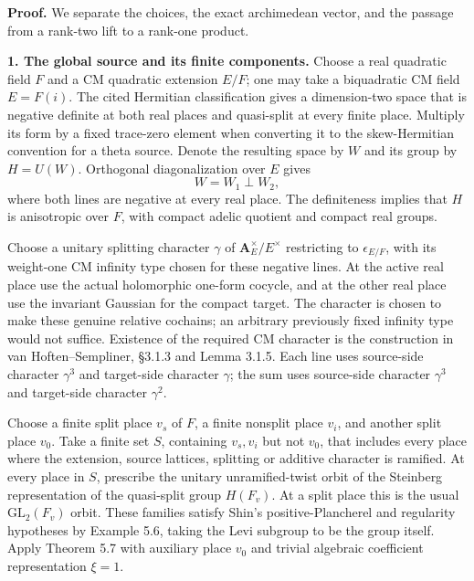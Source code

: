 \documentclass[11pt,a4paper]{article}
\theoremstyle{definition}
\begin{document}
\textbf{Proof.} We separate the choices, the exact archimedean vector, and the passage from a rank-two lift to a rank-one product.

\textbf{1. The global source and its finite components.} Choose a real quadratic field \(F\) and a CM quadratic extension \(E/F\); one may take a biquadratic CM field \(E=F(i)\). The cited Hermitian classification gives a dimension-two space that is negative definite at both real places and quasi-split at every finite place. Multiply its form by a fixed trace-zero element when converting it to the skew-Hermitian convention for a theta source. Denote the resulting space by \(W\) and its group by \(H=U(W)\). Orthogonal diagonalization over \(E\) gives \[
W=W_1\perp W_2,
\] where both lines are negative at every real place. The definiteness implies that \(H\) is anisotropic over \(F\), with compact adelic quotient and compact real groups.

Choose a unitary splitting character \(\gamma\) of \(\mathbf A_E^\times/E^\times\) restricting to \(\epsilon_{E/F}\), with its weight-one CM infinity type chosen for these negative lines. At the active real place use the actual holomorphic one-form cocycle, and at the other real place use the invariant Gaussian for the compact target. The character is chosen to make these genuine relative cochains; an arbitrary previously fixed infinity type would not suffice. Existence of the required CM character is the construction in van Hoften--Sempliner, §3.1.3 and Lemma 3.1.5. Each line uses source-side character \(\gamma^3\) and target-side character \(\gamma\); the sum uses source-side character \(\gamma^3\) and target-side character \(\gamma^2\).

Choose a finite split place \(v_s\) of \(F\), a finite nonsplit place \(v_i\), and another split place \(v_0\). Take a finite set \(S\), containing \(v_s,v_i\) but not \(v_0\), that includes every place where the extension, source lattices, splitting or additive character is ramified. At every place in \(S\), prescribe the unitary unramified-twist orbit of the Steinberg representation of the quasi-split group \(H(F_v)\). At a split place this is the usual \(\mathrm{GL}_2(F_v)\) orbit. These families satisfy Shin's positive-Plancherel and regularity hypotheses by Example 5.6, taking the Levi subgroup to be the group itself. Apply Theorem 5.7 with auxiliary place \(v_0\) and trivial algebraic coefficient representation \(\xi=1\).
\end{document}
